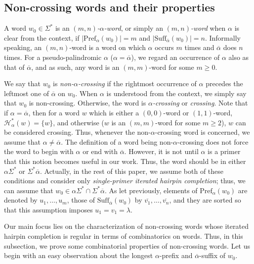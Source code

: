 \documentclass{article}
\theoremstyle{plain}
\theoremstyle{remark}
\newcommand{\HC}{\ensuremath{\mathcal{H}}}
\newcommand{\Pref}{\ensuremath{\mathrm{Pref}}}
\newcommand{\Suff}{\ensuremath{\mathrm{Suff}}}
\newcommand{\calpha}{\ensuremath{\overline{\alpha}}}
\begin{document}
\subsection{Non-crossing words and their properties}



A word $w_0 \in \Sigma^*$ is an {\it $(m, n)$-$\alpha$-word}, or simply an {\it $(m, n)$-word} when $\alpha$ is clear from the context, if $|\Pref_\alpha(w_0)| = m$ and $|\Suff_{\overline{\alpha}}(w_0)| = n$. 
Informally speaking, an $(m, n)$-word is a word on which $\alpha$ occurs $m$ times and $\overline{\alpha}$ does $n$ times. 
For a pseudo-palindromic $\alpha$ ($\alpha = \overline{\alpha}$), we regard an occurrence of $\alpha$ also as that of $\overline{\alpha}$, and as such, any word is an $(m, m)$-word for some $m \ge 0$. 

We say that $w_0$ is {\it non-$\alpha$-crossing} if the rightmost occurrence of $\alpha$ precedes the leftmost one of $\overline{\alpha}$ on $w_0$. 
When $\alpha$ is understood from the context, we simply say that $w_0$ is non-crossing. 
Otherwise, the word is {\it $\alpha$-crossing} or {\it crossing}. 
Note that if $\alpha = \overline{\alpha}$, then for a word $w$ which is either a $(0, 0)$-word or $(1, 1)$-word, $\HC_\alpha^*(w) = \{w\}$, and otherwise ($w$ is an $(m, m)$-word for some $m \ge 2$), $w$ can be considered crossing. 
Thus, whenever the non-$\alpha$-crossing word is concerned, we assume that $\alpha \neq \overline{\alpha}$. 
The definition of a word being non-$\alpha$-crossing does not force the word to begin with $\alpha$ or end with $\calpha$. 
However, it is not until $\alpha$ is a primer that this notion becomes useful in our work. 
Thus, the word should be in either $\alpha \Sigma^*$ or $\Sigma^* \calpha$. 
Actually, in the rest of this paper, we assume both of these conditions and consider only {\it single-primer iterated hairpin completion}; thus, we can assume that $w_0 \in \alpha \Sigma^* \cap \Sigma^* \calpha$. 
As let previously, elements of $\Pref_\alpha(w_0)$ are denoted by $u_1, \ldots, u_m$, those of $\Suff_{\calpha}(w_0)$ by $\overline{v_1}, \ldots, \overline{v_n}$, and they are sorted so that this assumption imposes $u_1 = v_1 = \lambda$. 

Our main focus lies on the characterization of non-crossing words whose iterated hairpin completion is regular in terms of combinatorics on words. 
Thus, in this subsection, we prove some combinatorial properties of non-crossing words. 
Let us begin with an easy observation about the longest $\alpha$-prefix and $\calpha$-suffix of $w_0$. 
\end{document}
